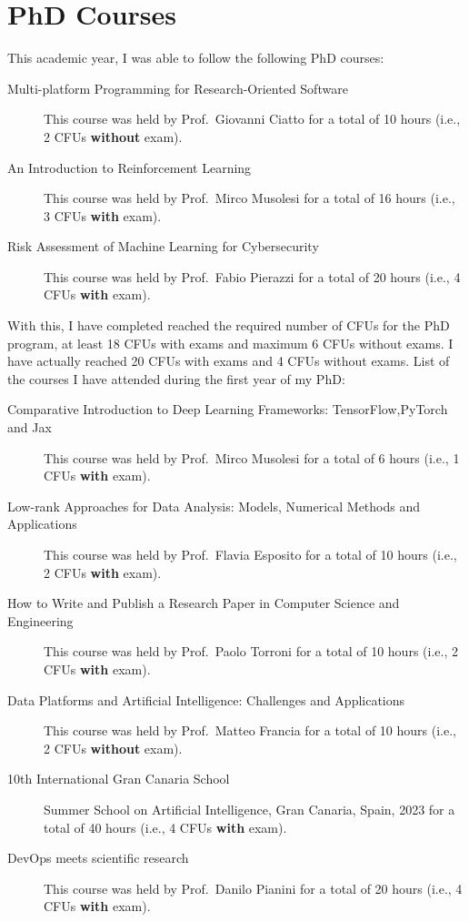 \documentclass[
]{ceurart}
\begin{document}
\section{PhD Courses}
\label{sec:phd-courses}

This academic year, I was able to follow the following PhD courses:
\begin{description}
    \item[Multi-platform Programming for Research-Oriented Software] This course was held by Prof.~Giovanni Ciatto for a total of 10 hours (i.e., 2 CFUs \textbf{without} exam).
    \item[An Introduction to Reinforcement Learning] This course was held by Prof.~Mirco Musolesi for a total of 16 hours (i.e., 3 CFUs \textbf{with} exam).
    \item[Risk Assessment of Machine Learning for Cybersecurity] This course was held by Prof.~Fabio Pierazzi for a total of 20 hours (i.e., 4 CFUs \textbf{with} exam).
\end{description}

With this, I have completed reached the required number of CFUs for the PhD program, at least 18 CFUs with exams and maximum 6 CFUs without exams.
%
I have actually reached 20 CFUs with exams and 4 CFUs without exams.
%
List of the courses I have attended during the first year of my PhD:
%
\begin{description}
    \item[Comparative Introduction to Deep Learning Frameworks: TensorFlow,PyTorch and Jax] This course was held by Prof.~Mirco Musolesi for a total of 6 hours (i.e., 1 CFUs \textbf{with} exam).
    \item[Low-rank Approaches for Data Analysis: Models, Numerical Methods and Applications] This course was held by Prof.~Flavia Esposito for a total of 10 hours (i.e., 2 CFUs \textbf{with} exam).
    \item[How to Write and Publish a Research Paper in Computer Science and Engineering] This course was held by Prof.~Paolo Torroni for a total of 10 hours (i.e., 2 CFUs \textbf{with} exam).
    \item[Data Platforms and Artificial Intelligence: Challenges and Applications] This course was held by Prof.~Matteo Francia for a total of 10 hours (i.e., 2 CFUs \textbf{without} exam).
    \item[10th International Gran Canaria School] Summer School on Artificial Intelligence, Gran Canaria, Spain, 2023 for a total of 40 hours (i.e., 4 CFUs \textbf{with} exam).
    \item[DevOps meets scientific research] This course was held by Prof.~Danilo Pianini for a total of 20 hours (i.e., 4 CFUs \textbf{with} exam).
\end{description}


\end{document}

